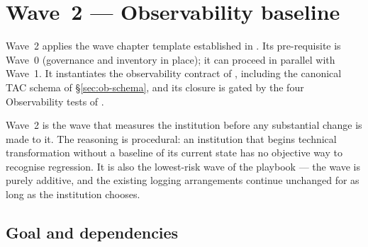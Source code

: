 
\chapter{Wave~2 --- Observability baseline}
\label{ch:wave2-observability}

\begin{caveatbox}[Dependencies]
\noindent Wave~2 applies the wave chapter template established in
. Its pre-requisite is Wave~0
(governance and inventory in place); it can proceed in parallel
with Wave~1. It instantiates the observability contract of
, including the canonical TAC schema of
\S\ref{sec:ob-schema}, and its closure is gated by the four
Observability tests of .
\end{caveatbox}

Wave~2 is the wave that measures the institution before any
substantial change is made to it. The reasoning is procedural: an
institution that begins technical transformation without a baseline
of its current state has no objective way to recognise regression.
It is also the lowest-risk wave of the playbook --- the wave is
purely additive, and the existing logging arrangements continue
unchanged for as long as the institution chooses.

\section{Goal and dependencies}
\label{sec:w2-goal}

